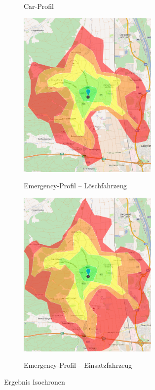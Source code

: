 \documentclass[12pt,a4paper]{article}
\begin{document}
\begin{figure}[h]
\begin{subfigure}{0.49\textwidth}
\caption{Car-Profil}
\label{fig:isocar}
\end{subfigure}
\begin{subfigure}{0.49\textwidth}
\centering
\includegraphics[width = 0.75\textwidth]{../media/isofire.png} \\
\caption{Emergency-Profil -- Löschfahrzeug}
\label{fig:isofire}
\end{subfigure}
\begin{subfigure}{0.49\textwidth}
\centering
\includegraphics[width = 0.75\textwidth]{../media/isoeme.png} \\
\caption{Emergency-Profil -- Einsatzfahrzeug}
\label{fig:isoeme}
\end{subfigure}
\caption{Ergebnis Isochronen}
\label{fig:isochrones}
\end{figure}
\end{document}
